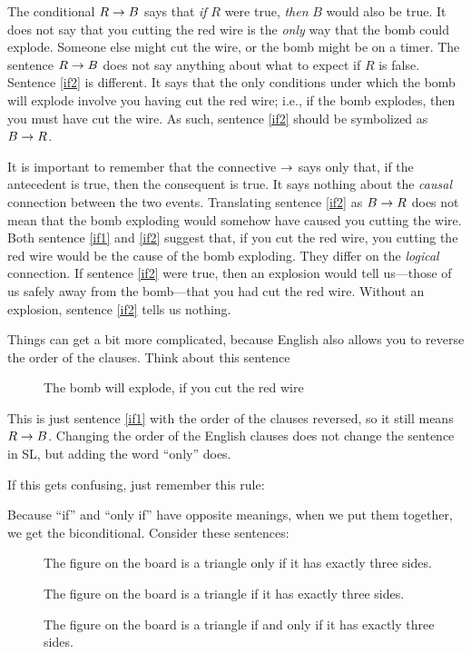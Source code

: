The conditional $R\mathrel{\rightarrow} B$ says that \emph{if} $R$ were true, \emph{then} $B$ would also be true. It does not say that you cutting the red wire is the \emph{only} way that the bomb could explode. Someone else might cut the wire, or the bomb might be on a timer. The sentence $R\mathrel{\rightarrow} B$ does not say anything about what to expect if $R$ is false. Sentence \ref{if2} is different. It says that the only conditions under which the bomb will explode involve you having cut the red wire; i.e., if the bomb explodes, then you must have cut the wire. As such, sentence \ref{if2} should be symbolized as $B \mathrel{\rightarrow} R$.

It is important to remember that the connective $\mathrel{\rightarrow}$ says only that, if the antecedent is true, then the consequent is true. It says nothing about the \emph{causal} connection between the two events. Translating sentence \ref{if2} as $B \mathrel{\rightarrow} R$ does not mean that the bomb exploding would somehow have caused you cutting the wire. Both sentence \ref{if1} and \ref{if2} suggest that, if you cut the red wire, you cutting the red wire would be the cause of the bomb exploding. They differ on the \emph{logical} connection. If sentence \ref{if2} were true, then an explosion would tell us---those of us safely away from the bomb---that you had cut the red wire. Without an explosion, sentence \ref{if2} tells us nothing.

Things can get a bit more complicated, because English also allows you to reverse the order of the clauses. Think about this sentence

\begin{description}
\item[\label{if3}] The bomb will explode, if you cut the red wire
\end{description}

This is just sentence \ref{if1} with the order of the clauses reversed, so it still means $R \mathrel{\rightarrow} B$. Changing the order of the English clauses does not change the sentence in SL, but adding the word ``only'' does.

If this gets confusing, just remember this rule:

Because ``if'' and ``only if'' have opposite meanings, when we put them together, we get the biconditional. Consider these sentences:
\begin{description}
\item[\label{iff1}] The figure on the board is a triangle only if it has exactly three sides.
\item[\label{iff2}] The figure on the board is a triangle if it has exactly three sides.
\item[\label{iff3}] The figure on the board is a triangle if and only if it has exactly three sides.
\end{description}

